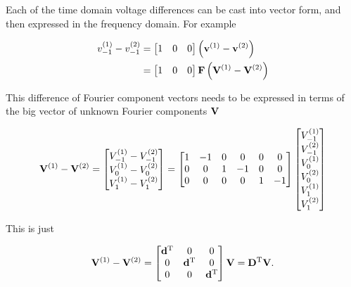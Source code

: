 \documentclass[12pt,journal,compsoc]{../ieeepaper/IEEEtran}
\begin{document}
Each of the time domain voltage differences can be cast into vector form, and then expressed in the frequency domain.  For example

\begin{equation}\label{eqn:ece1254projectReport:1380}
\begin{aligned}
v^{(1)}_{-1} - v^{(2)}_{-1} 
&=
\begin{bmatrix}
1 & 0 & 0 
\end{bmatrix}
\lr{ \Bv^{(1)} - \Bv^{(2)} } \\
&=
\begin{bmatrix}
1 & 0 & 0 
\end{bmatrix}
\BF
\lr{ \BV^{(1)} - \BV^{(2)} }
\end{aligned}
\end{equation}

This difference of Fourier component vectors needs to be expressed in terms of the big vector of unknown Fourier components \( \mathbf{V} \)

\begin{dmath}\label{eqn:ece1254projectReport:1000}
\BV^{(1)} - \BV^{(2)} 
=
\begin{bmatrix}
V^{(1)}_{-1} - V^{(2)}_{-1} \\
V^{(1)}_{0} - V^{(2)}_{0} \\
V^{(1)}_{1} - V^{(2)}_{1} \\
\end{bmatrix}
=
\begin{bmatrix}
1 & -1 & 0 & 0 & 0 & 0 \\
0 &  0 & 1 & -1 & 0 & 0 \\
0 &  0 & 0 & 0 & 1 & -1 \\
\end{bmatrix}
\begin{bmatrix}
V_{-1}^{(1)} \\
V_{-1}^{(2)} \\
V_{0}^{(1)} \\
V_{0}^{(2)} \\
V_{1}^{(1)} \\
V_{1}^{(2)} \\
\end{bmatrix}
\end{dmath}

This is just

\begin{equation}\label{eqn:ece1254projectReport:1400}
\BV^{(1)} - \BV^{(2)} 
=
\begin{bmatrix}
\Bd^\T & 0 & 0 \\
0 & \Bd^\T & 0 \\
0 & 0 & \Bd^\T \\
\end{bmatrix}
\BV
= \BD^\T \BV.
\end{equation}
\end{document}
